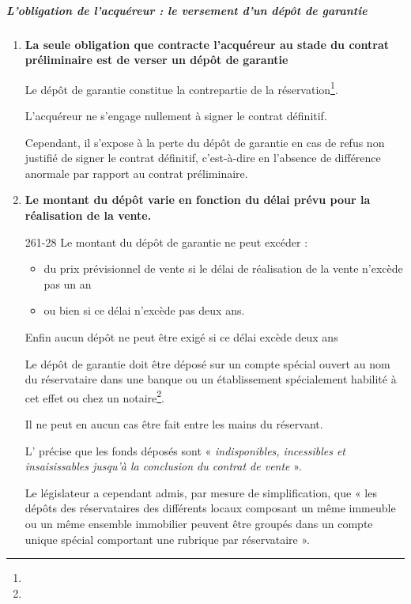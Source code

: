 				\subparagraph{L'obligation de l'acquéreur : le versement d'un dépôt de garantie}

					\begin{enumerate}
						\item \textbf{La seule obligation que contracte l’acquéreur au stade du contrat préliminaire est de verser un dépôt de garantie}

						Le dépôt de garantie constitue la contrepartie de la réservation\footnote{}.

						L’acquéreur ne s’engage nullement à signer le contrat définitif.

						Cependant, il s’expose à la perte du dépôt de garantie en cas de refus non justifié de signer le contrat définitif, c'est-à-dire en l’absence de différence anormale par rapport au contrat préliminaire.


					\item\textbf{Le montant du dépôt varie en fonction du délai prévu pour la réalisation de la vente.}

						\begin{citationArticle}[R]{261-28}{\cch}
							Le montant du dépôt de garantie ne peut excéder :
						\begin{itemize}
							\item {} du prix prévisionnel de vente si le délai de réalisation de la vente n'excède pas un an
							\item ou bien  si ce délai n'excède pas deux ans.
						\end{itemize}

						Enfin aucun dépôt ne peut être exigé si ce délai excède deux ans
						\end{citationArticle}

						Le dépôt de garantie doit être déposé sur un compte spécial ouvert au nom du réservataire dans une banque ou un établissement spécialement habilité à cet effet ou chez un notaire\footnote{}.

						Il ne peut en aucun cas être fait entre les mains du réservant.

						L’ précise que les fonds déposés sont « {\itshape indisponibles, incessibles et insaisissables jusqu'à la conclusion du contrat de vente} ».

						Le législateur a cependant admis, par mesure de simplification, que « {les dépôts des réservataires des différents locaux composant un même immeuble ou un même ensemble immobilier peuvent être groupés dans un compte unique spécial comportant une rubrique par réservataire} ».


\end{enumerate}
